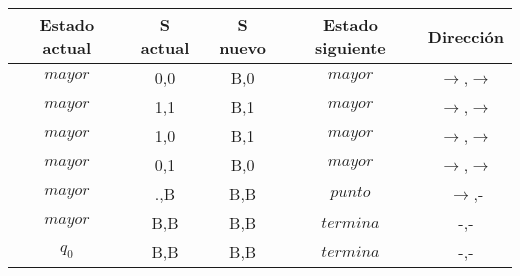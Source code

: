 \documentclass[12pt]{article}
\begin{document}
\begin{center}
	\begin{tabular}{ |c|c|c|c|c| }
		\hline
		Estado actual & S actual & S nuevo & Estado siguiente & Dirección\\
		\hline
		$mayor$ & 0,0 & B,0 & $mayor$ & $\rightarrow$,$\rightarrow$\\
		$mayor$ & 1,1 & B,1 & $mayor$ & $\rightarrow$,$\rightarrow$\\
		$mayor$ & 1,0 & B,1 & $mayor$ & $\rightarrow$,$\rightarrow$\\
		$mayor$ & 0,1 & B,0 & $mayor$ & $\rightarrow$,$\rightarrow$\\
		$mayor$ & .,B & B,B & $punto$ & $\rightarrow$,-\\
		\hline
		$mayor$ & B,B & B,B & $termina$ & -,-\\
		$q_{0}$ & B,B & B,B & $termina$ & -,-\\
		\hline
	\end{tabular} 
\end{center}
\end{document}
